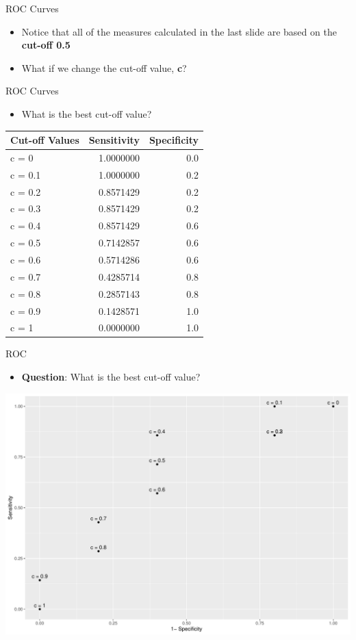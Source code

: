 \documentclass[
  ignorenonframetext,
]{beamer}
\providecommand{\tightlist}{%
  \setlength{\itemsep}{0pt}\setlength{\parskip}{0pt}}
\begin{document}
\begin{frame}{ROC Curves}
\protect\hypertarget{roc-curves}{}
\begin{itemize}
\item
  Notice that all of the measures calculated in the last slide are based
  on the \textbf{cut-off 0.5}
\item
  What if we change the cut-off value, \textbf{c}?
\end{itemize}
\end{frame}

\begin{frame}{ROC Curves}
\protect\hypertarget{roc-curves-1}{}
\begin{itemize}
\tightlist
\item
  What is the best cut-off value?
\end{itemize}

\begin{longtable}[]{@{}lrr@{}}
\toprule
Cut-off Values & Sensitivity & Specificity \\
\midrule
\endhead
c = 0 & 1.0000000 & 0.0 \\
c = 0.1 & 1.0000000 & 0.2 \\
c = 0.2 & 0.8571429 & 0.2 \\
c = 0.3 & 0.8571429 & 0.2 \\
c = 0.4 & 0.8571429 & 0.6 \\
c = 0.5 & 0.7142857 & 0.6 \\
c = 0.6 & 0.5714286 & 0.6 \\
c = 0.7 & 0.4285714 & 0.8 \\
c = 0.8 & 0.2857143 & 0.8 \\
c = 0.9 & 0.1428571 & 1.0 \\
c = 1 & 0.0000000 & 1.0 \\
\bottomrule
\end{longtable}
\end{frame}

\begin{frame}{ROC}
\protect\hypertarget{roc}{}
\begin{itemize}
\tightlist
\item
  \textbf{Question}: What is the best cut-off value?
\end{itemize}

\includegraphics{measuring_performance_files/figure-beamer/unnamed-chunk-4-1.pdf}
\end{frame}
\end{document}
